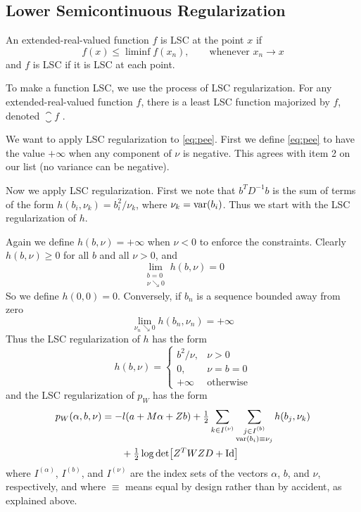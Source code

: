\subsection{Lower Semicontinuous Regularization}
\label{sec:lsc}

An extended-real-valued function $f$ is LSC at the point $x$ if
$$
   f(x) \le \liminf f(x_n), \qquad \text{whenever $x_n \to x$}
$$
and $f$ is LSC if it is LSC at each point.

To make a function LSC, we use the process of LSC regularization.
For any extended-real-valued function $f$, there is a least LSC function
majorized by $f$, denoted $\closure f$ \citep[Section~1.D]{rockafellar-wets}.

We want to apply LSC regularization to \eqref{eq:pee}.  First we define
\eqref{eq:pee} to have the value $+\infty$ when any component of $\nu$ is
negative.  This agrees with item 2 on our list (no variance can be negative).

Now we apply LSC regularization.  First we note that $b^T D^{-1} b$ is the
sum of terms of the form $h(b_i, \nu_k) = b_i^2 / \nu_k$,
where $\nu_k = \operatorname{var}(b_i)$.  Thus we start with the LSC regularization of $h$.

Again we define $h(b, \nu) = +\infty$ when $\nu < 0$ to enforce
the constraints.  Clearly $h(b, \nu) \ge 0$ for all $b$ and all $\nu > 0$, and
$$
   \lim_{\substack{b = 0 \\ \nu \searrow 0}} h(b, \nu) = 0
$$
So we define $h(0, 0) = 0$.  Conversely, if $b_n$ is a sequence bounded
away from zero
$$
   \lim_{\nu_n \searrow 0} h(b_n, \nu_n) = + \infty
$$
Thus the LSC regularization of $h$ has the form
\begin{equation} \label{eq:h}
   h(b, \nu) =
   \begin{cases}
   b^2 / \nu, & \nu > 0
   \\
   0, & \nu = b = 0
   \\
   +\infty & \text{otherwise}
   \end{cases}
\end{equation}
and the LSC regularization of $p_W$ has the form
\begin{equation} \label{eq:pee-lsc}
\begin{split}
   p_W(\alpha, b, \nu)
   & =
   - l(a + M \alpha + Z b)
   + \tfrac{1}{2}
   \sum_{k \in I^{(\nu)}}
   \sum_{\substack{j \in I^{(b)} \\ \operatorname{var}(b_i) \equiv \nu_j}}
   h(b_j, \nu_k)
   \\
   & \qquad
   + \tfrac{1}{2} \log \det \bigl[ Z^T W Z D + \text{Id}
   \bigr]
\end{split}
\end{equation}
where $I^{(\alpha)}$, $I^{(b)}$, and $I^{(\nu)}$ are the
index sets of the vectors $\alpha$, $b$, and $\nu$, respectively,
and where
$\equiv$ means equal by design rather than by accident, as explained above.

